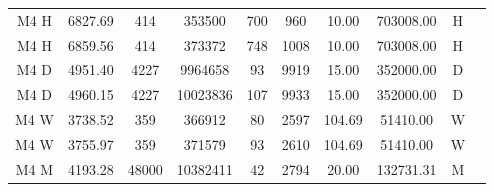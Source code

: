 \begin{table}[htb]
\begin{tabular}{c | c c c c c c c c c}
    \hline
    M4 H              & 6827.69        & 414              & 353500          & 700                & 960               & 10.00         & 703008.00     & H               \\
    M4 H              & 6859.56        & 414              & 373372          & 748                & 1008              & 10.00         & 703008.00     & H               \\
    \hline
    M4 D              & 4951.40        & 4227             & 9964658         & 93                 & 9919              & 15.00         & 352000.00     & D               \\
    M4 D              & 4960.15        & 4227             & 10023836        & 107                & 9933              & 15.00         & 352000.00     & D               \\
    \hline
    M4 W              & 3738.52        & 359              & 366912          & 80                 & 2597              & 104.69        & 51410.00      & W               \\
    M4 W              & 3755.97        & 359              & 371579          & 93                 & 2610              & 104.69        & 51410.00      & W               \\
    \hline
    M4 M              & 4193.28        & 48000            & 10382411        & 42                 & 2794              & 20.00         & 132731.31     & M               \\

\end{tabular}
\end{table}
